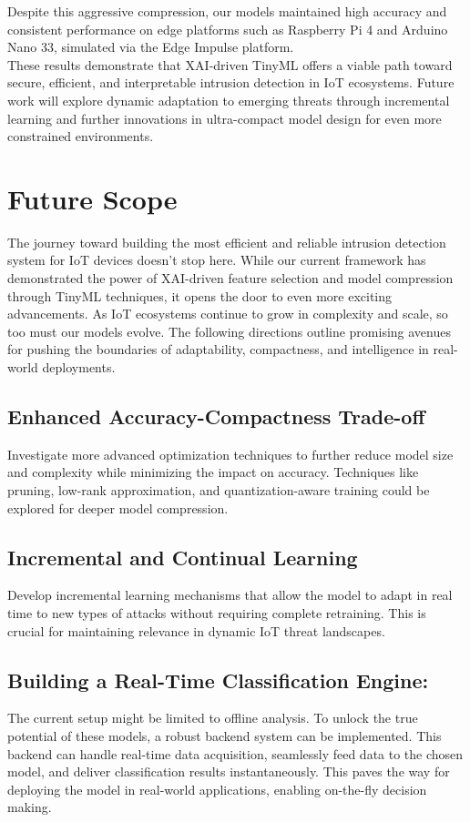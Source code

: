 \documentclass[conference,letterpaper]{IEEEtran}
\begin{document}
Despite this aggressive compression, our models maintained high accuracy and consistent performance on edge platforms such as Raspberry Pi 4 and Arduino Nano 33, simulated via the Edge Impulse platform.
\\

These results demonstrate that XAI-driven TinyML offers a viable path toward secure, efficient, and interpretable intrusion detection in IoT ecosystems. Future work will explore dynamic adaptation to emerging threats through incremental learning and further innovations in ultra-compact model design for even more constrained environments.
\section{Future Scope}
The journey toward building the most efficient and reliable intrusion detection system for IoT devices doesn’t stop here. While our current framework has demonstrated the power of XAI-driven feature selection and model compression through TinyML techniques, it opens the door to even more exciting advancements. As IoT ecosystems continue to grow in complexity and scale, so too must our models evolve. The following directions outline promising avenues for pushing the boundaries of adaptability, compactness, and intelligence in real-world deployments.

\subsection{Enhanced Accuracy-Compactness Trade-off}Investigate more advanced optimization techniques to further reduce model size and complexity while minimizing the impact on accuracy. Techniques like pruning, low-rank approximation, and quantization-aware training could be explored for deeper model compression.

\subsection{Incremental and Continual Learning} Develop incremental learning mechanisms that allow the model to adapt in real time to new types of attacks without requiring complete retraining. This is crucial for maintaining relevance in dynamic IoT threat landscapes.
\subsection{Building a Real-Time Classification Engine:}
The current setup might be limited to offline analysis. To unlock the true potential of these models, a robust backend system can be implemented. This backend can handle real-time data acquisition, seamlessly feed data to the chosen model, and deliver classification results instantaneously. This paves the way for deploying the model in real-world applications, enabling on-the-fly decision making.
\end{document}
